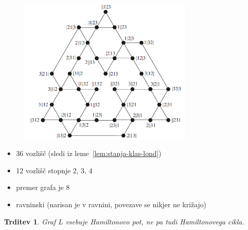 \documentclass[11pt,a4paper]{article}
\theoremstyle{definition} %
\theoremstyle{plain} %
\newtheorem{lema}[definicija]{Lema}
\newtheorem{trditev}[definicija]{Trditev}
\begin{document}
\begin{figure}[h]
    \centering
    \includegraphics[height=200pt]{../img/tolgraph.png}
\end{figure}


\begin{itemize}
    \item 36 vozlišč (sledi iz leme~\ref{lem:stanja-klas-lond})
    \item 12 vozlišč stopnje 2, 3, 4
    \item premer grafa je 8
    \item ravninski (narisan je v ravnini, povezave se nikjer ne križajo)
\end{itemize}

\begin{trditev}
    Graf $L$ vsebuje Hamiltonovo pot, ne pa tudi Hamiltonovega cikla.
\end{trditev}
\end{document}
